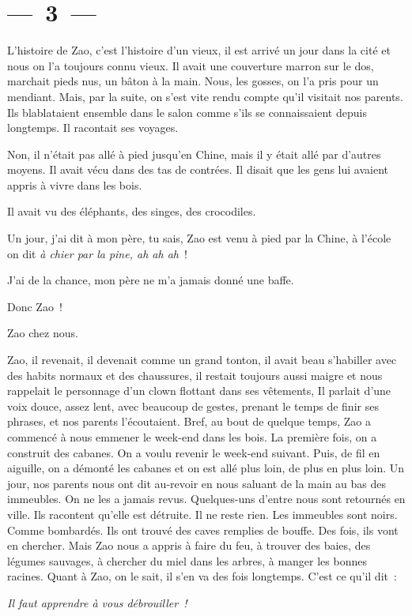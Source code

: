 \documentclass[french,twoside]{book} %
\begin{document}
\section[{— 3 —}]{— 3 —}
\renewcommand{\leftmark}{— 3 —}

\noindent L’histoire de Zao, c’est l’histoire d’un vieux, il est arrivé un jour dans la cité et nous on l’a toujours connu vieux. Il avait une couverture marron sur le dos, marchait pieds nus, un bâton à la main. Nous, les gosses, on l’a pris pour un mendiant. Mais, par la suite, on s’est vite rendu compte qu’il visitait nos parents. Ils blablataient ensemble dans le salon comme s’ils se connaissaient depuis longtemps. Il racontait ses voyages.\par
Non, il n’était pas allé à pied jusqu’en Chine, mais il y était allé par d’autres moyens. Il avait vécu dans des tas de contrées. Il disait que les gens lui avaient appris à vivre dans les bois.\par
Il avait vu des éléphants, des singes, des crocodiles.\par
Un jour, j’ai dit à mon père, tu sais, Zao est venu à pied par la Chine, à l’école on dit \emph{à chier par la pine, ah ah ah} !\par
J’ai de la chance, mon père ne m’a jamais donné une baffe.\par
Donc Zao !\par
Zao chez nous.\par
Zao, il revenait, il devenait comme un grand tonton, il avait beau s’habiller avec des habits normaux et des chaussures, il restait toujours aussi maigre et nous rappelait le personnage d’un clown flottant dans ses vêtements, Il parlait d’une voix douce, assez lent, avec beaucoup de gestes, prenant le temps de finir ses phrases, et nos parents l’écoutaient. Bref, au bout de quelque temps, Zao a commencé à nous emmener le week-end dans les bois. La première fois, on a construit des cabanes. On a voulu revenir le week-end suivant. Puis, de fil en aiguille, on a démonté les cabanes et on est allé plus loin, de plus en plus loin. Un jour, nos parents nous ont dit au-revoir en nous saluant de la main au bas des immeubles. On ne les a jamais revus. Quelques-uns d’entre nous sont retournés en ville. Ils racontent qu’elle est détruite. Il ne reste rien. Les immeubles sont noirs. Comme bombardés. Ils ont trouvé des caves remplies de bouffe. Des fois, ils vont en chercher. Mais Zao nous a appris à faire du feu, à trouver des baies, des légumes sauvages, à chercher du miel dans les arbres, à manger les bonnes racines. Quant à Zao, on le sait, il s’en va des fois longtemps. C’est ce qu’il dit :\par
{\itshape Il faut apprendre à vous débrouiller !}
\end{document}
